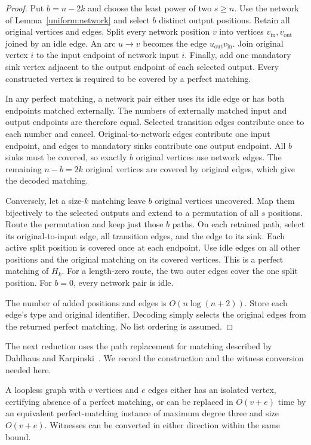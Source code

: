 \begin{proof}
Put $b=n-2k$ and choose the least power of two $s\ge n$. Use the network of
Lemma~\ref{uniform:network} and select $b$ distinct output positions.
Retain all original vertices and edges. Split every network position $v$
into vertices $v_{\mathrm{in}},v_{\mathrm{out}}$ joined by an idle edge.
An arc $u\to v$ becomes the edge $u_{\mathrm{out}}v_{\mathrm{in}}$.
Join original vertex $i$ to the input endpoint of network input $i$.
Finally, add one mandatory sink vertex adjacent to the output endpoint
of each selected output. Every constructed vertex is required to be
covered by a perfect matching.

In any perfect matching, a network pair either uses its idle edge or has
both endpoints matched externally. The numbers of externally matched input
and output endpoints are therefore equal. Selected transition edges
contribute once to each number and cancel. Original-to-network edges
contribute one input endpoint, and edges to mandatory sinks contribute one
output endpoint. All $b$ sinks must be covered, so exactly $b$ original
vertices use network edges. The remaining $n-b=2k$ original vertices are
covered by original edges, which give the decoded matching.

Conversely, let a size-$k$ matching leave $b$ original vertices uncovered.
Map them bijectively to the selected outputs and extend to a permutation
of all $s$ positions. Route the permutation and keep just those $b$ paths.
On each retained path, select its original-to-input edge, all transition
edges, and the edge to its sink. Each active split position is covered once
at each endpoint. Use idle edges on all other positions and the original
matching on its covered vertices. This is a perfect matching of $H_k$.
For a length-zero route, the two outer edges cover the one split position.
For $b=0$, every network pair is idle.

The number of added positions and edges is $O(n\log(n+2))$. Store each edge's
type and original identifier. Decoding simply selects the original edges
from the returned perfect matching. No list ordering is assumed.
\end{proof}

The next reduction uses the path replacement for matching described by
Dahlhaus and Karpinski~\cite{DahlhausKarpinski}. We record the construction
and the witness conversion needed here.

\begin{lemma}\label{uniform:degree}
A loopless graph with $v$ vertices and $e$ edges either has an isolated
vertex, certifying absence of a perfect matching, or can be replaced in
$O(v+e)$ time by an equivalent perfect-matching instance of maximum degree
three and size $O(v+e)$. Witnesses can be converted in either direction
within the same bound.
\end{lemma}

